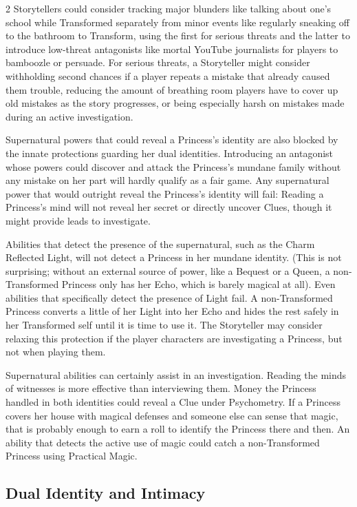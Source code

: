 \begin{multicols}{2}
Storytellers could consider tracking major blunders like talking about one's school while Transformed separately from minor events like regularly sneaking off to the bathroom to Transform, using the first for serious threats and the latter to introduce low-threat antagonists like mortal YouTube journalists for players to bamboozle or persuade. For serious threats, a Storyteller might consider withholding second chances if a player repeats a mistake that already caused them trouble, reducing the amount of breathing room players have to cover up old mistakes as the story progresses, or being especially harsh on mistakes made during an active investigation. 

Supernatural powers that could reveal a Princess's identity are also blocked by the innate protections guarding her dual identities. Introducing an antagonist whose powers could discover and attack the Princess's mundane family without any mistake on her part will hardly qualify as a fair game. Any supernatural power that would outright reveal the Princess's identity will fail: Reading a Princess's mind will not reveal her secret or directly uncover Clues, though it might provide leads to investigate. 

Abilities that detect the presence of the supernatural, such as the Charm Reflected Light, will not detect a Princess in her mundane identity. (This is not surprising; without an external source of power, like a Bequest or a Queen, a non-Transformed Princess only has her Echo, which is barely magical at all). Even abilities that specifically detect the presence of Light fail. A non-Transformed Princess converts a little of her Light into her Echo and hides the rest safely in her Transformed self until it is time to use it. The Storyteller may consider relaxing this protection if the player characters are investigating a Princess, but not when playing them. 

Supernatural abilities can certainly assist in an investigation. Reading the minds of witnesses is more effective than interviewing them. Money the Princess handled in both identities could reveal a Clue under Psychometry. If a Princess covers her house with magical defenses and someone else can sense that magic, that is probably enough to earn a roll to identify the Princess there and then. An ability that detects the active use of magic could catch a non-Transformed Princess using Practical Magic. 

\subsection*{Dual Identity and Intimacy}


\end{multicols}
